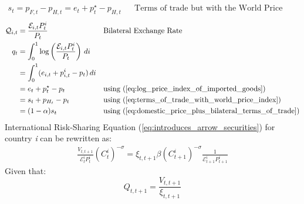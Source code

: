 \documentclass[12pt]{article}
\begin{document}
\begin{align}
    s_t = p_{F,t} - p_{H,t} = e_t + p_t^{\star} - p_{H,t} \label{eq:terms_of_trade_with_world_price_index} &  & \text{Terms of trade but with the World Price Index}
\end{align}
\begin{align}
    \mathcal{Q}_{i,t} & = \frac{\mathcal{E}_{i,t}P_{t}^i}{P_t}                                        &  & \text{Bilateral Exchange Rate}                                       \\
    q_t               & = \int_{0}^{1} \log \left( \frac{\mathcal{E}_{i,t}P_{t}^i}{P_t} \right) \, di                                                                           \\
                      & = \int_{0}^{1} (e_{i,t} + p_{i,t}^i - p_t) \, di                              &  &                                                                      \\
                      & = e_t + p_t^{\star} - p_t                                                     &  & \text{using (\ref{eq:log_price_index_of_imported_goods})}            \\
                      & = s_t + p_{H_t} - p_t                                                         &  & \text{using (\ref{eq:terms_of_trade_with_world_price_index})}        \\
                      & = (1-\alpha)s_t                                                               &  & \text{using (\ref{eq:domestic_price_plus_bilateral_terms_of_trade})}
\end{align}
International Risk-Sharing
Equation (\ref{eq:introduces_arrow_securities}) for country \textit{i} can be rewritten as:
\begin{align}
    \frac{V_{t,t+1}}{\mathcal{E}^i_tP^i_t}({C^{i}_{t}})^{-\sigma} = \xi_{t,t+1} \beta ({C^{i}_{t+1}})^{-\sigma} \frac{1}{\mathcal{E}^i_{t+1}P^{i}_{t+1}}
\end{align}
Given that:
\begin{equation}
    Q_{t,t+1} = \frac{V_{t,t+1}}{\xi_{t,t+1}}
\end{equation}
\end{document}
